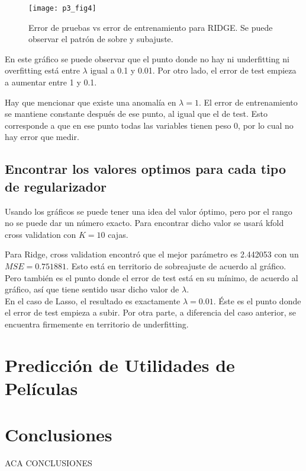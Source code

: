 \documentclass[letter, 10pt]{article}
\begin{document}
\begin{figure}[H]
  \centering
  \texttt{[image: p3\_fig4]} 
  \caption{Error de pruebas vs error de entrenamiento para RIDGE. Se puede
    observar el patrón de sobre y subajuste.}
  \label{fig:p3_g2}
\end{figure}

En este gráfico se puede observar que el punto donde no hay ni underfitting ni
overfitting está entre $\lambda$ igual a 0.1 y 0.01. Por otro lado, el error de
test empieza a aumentar entre 1 y 0.1.

Hay que mencionar que existe una anomalía en $\lambda = 1$. El error de
entrenamiento se mantiene constante después de ese punto, al igual que el de
test. Esto corresponde a que en ese punto todas las variables tienen peso 0, por
lo cual no hay error que medir.
\subsection{Encontrar los valores optimos para cada tipo de regularizador}
Usando los gráficos se puede tener una idea del valor óptimo, pero por el rango
no se puede dar un número exacto. Para encontrar dicho valor se usará kfold
cross validation con $K = 10$ cajas.

Para Ridge, cross validation encontró que el mejor parámetro es 2.442053 con un
$MSE = 0.751881$. Esto está en territorio de sobreajuste de acuerdo al gráfico.
Pero también es el punto donde el error de test está en su mínimo, de acuerdo al
gráfico, así que tiene sentido usar dicho valor de $\lambda$.\\

En el caso de Lasso, el resultado es exactamente $\lambda = 0.01$. Éste es el punto donde el
error de test empieza a subir. Por otra parte, a diferencia del caso anterior,
se encuentra firmemente en territorio de underfitting.
\section{Predicción de Utilidades de Películas}

\section{Conclusiones}

ACA CONCLUSIONES



\end{document}
